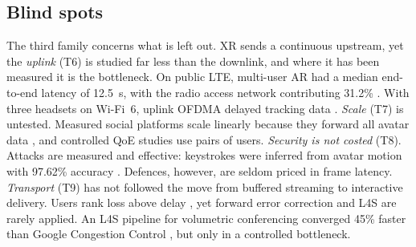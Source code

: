 \subsection{Blind spots}
The third family concerns what is left out. XR sends a continuous upstream, yet the \emph{uplink} (T6)
is studied far less than the downlink, and where it has been measured it is the bottleneck. On public
LTE, multi-user AR had a median end-to-end latency of 12.5~s, with the radio access network contributing
31.2\% \cite{W3047439371}. With three headsets on Wi-Fi~6, uplink OFDMA delayed tracking data
\cite{W4396853623}. \emph{Scale} (T7) is untested. Measured social platforms scale linearly because they
forward all avatar data \cite{W4307020344}, and controlled QoE studies use pairs of users. \emph{Security
is not costed} (T8). Attacks are measured and effective: keystrokes were inferred from avatar motion with
97.62\% accuracy \cite{W4398796475}. Defences, however, are seldom priced in frame latency.
\emph{Transport} (T9) has not followed the move from buffered streaming to interactive delivery. Users
rank loss above delay \cite{W3095344018,W4404916373}, yet forward error correction and L4S are rarely
applied. An L4S pipeline for volumetric conferencing converged 45\% faster than Google Congestion Control
\cite{W4408870658}, but only in a controlled bottleneck.

